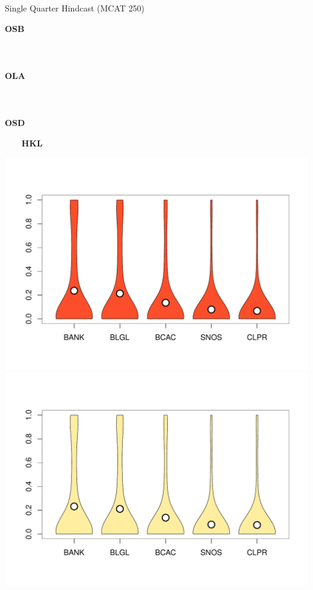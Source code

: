 \documentclass[ xcolor = pdftex, dvipsnames, table ]{beamer}
\begin{document}
\begin{frame}{Single Quarter Hindcast (MCAT 250)} %
\hspace*{-1cm}
\begin{minipage}{0.09\textwidth}
\textbf{OSB}\\\\\\\\%
\textbf{OLA}\\\\\\\\%
\textbf{OSD}
\end{minipage}
\hspace*{-0.5cm}
\begin{minipage}{0.29\textwidth}
\begin{center}
$~~~~~~~~~$\textbf{HKL}
\end{center}
\vspace*{-0.75cm}
\includegraphics[height=0.36\textheight]{../pictures/vioStarAvgOSBHKL.pdf}\\
\vspace*{-1.3cm}
\includegraphics[height=0.36\textheight]{../pictures/vioStarAvgOLAHKL.pdf}\\

\end{minipage}
\end{frame}
\end{document}
